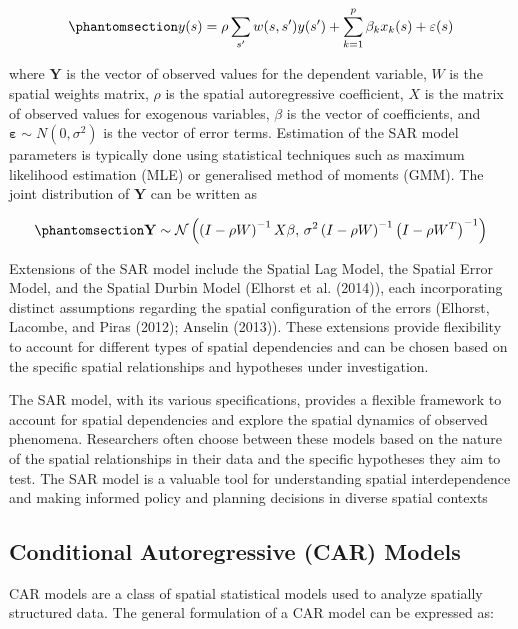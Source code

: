 \documentclass[
  default,
]{sn-jnl}
\begin{document}
\begin{equation}\phantomsection\label{eq-sar}{
y(s) = \rho \sum_{s'} w(s,s') y(s') + \sum_{k=1}^p \beta_k x_k(s) + \varepsilon(s)
}\end{equation}

where \(\mathbf{Y}\) is the vector of observed values for the dependent
variable, \(W\) is the spatial weights matrix, \(\rho\) is the spatial
autoregressive coefficient, \(X\) is the matrix of observed values for
exogenous variables, \(\beta\) is the vector of coefficients, and
\(\boldsymbol{\varepsilon} \sim N(0,\sigma^2)\) is the vector of error
terms. Estimation of the SAR model parameters is typically done using
statistical techniques such as maximum likelihood estimation (MLE) or
generalised method of moments (GMM). The joint distribution of
\(\mathbf{Y}\) can be written as

\begin{equation}\phantomsection\label{eq-jointysar}{
\mathbf{Y} \sim \mathcal{N}\left( \left( I - \rho W \right)^{-1} X\beta, \, \sigma^2 \left( I - \rho W \right)^{-1} \left( I - \rho W^T \right)^{-1} \right)
}\end{equation}

Extensions of the SAR model include the Spatial Lag Model, the Spatial
Error Model, and the Spatial Durbin Model (Elhorst et al. (2014)), each
incorporating distinct assumptions regarding the spatial configuration
of the errors (Elhorst, Lacombe, and Piras (2012); Anselin (2013)).
These extensions provide flexibility to account for different types of
spatial dependencies and can be chosen based on the specific spatial
relationships and hypotheses under investigation.

The SAR model, with its various specifications, provides a flexible
framework to account for spatial dependencies and explore the spatial
dynamics of observed phenomena. Researchers often choose between these
models based on the nature of the spatial relationships in their data
and the specific hypotheses they aim to test. The SAR model is a
valuable tool for understanding spatial interdependence and making
informed policy and planning decisions in diverse spatial contexts

\subsection{Conditional Autoregressive (CAR)
Models}\label{conditional-autoregressive-car-models}

CAR models are a class of spatial statistical models used to analyze
spatially structured data. The general formulation of a CAR model can be
expressed as:
\end{document}
